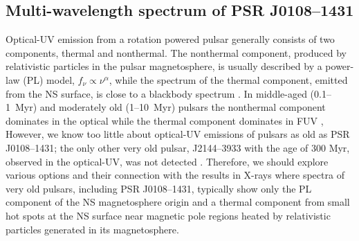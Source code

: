 \documentclass[pdftex,twocolumn]{aastex62}
\newcommand{\gp}[1]{{\color{blue} #1}}
\begin{document}
\subsection{Multi-wavelength  spectrum of PSR J0108--1431}
Optical-UV emission from a rotation powered pulsar generally consists of two components, thermal and nonthermal. The nonthermal component, produced by relativistic particles in the pulsar magnetosphere, is usually described by a power-law (PL) model, $f_\nu \propto \nu^\alpha$, while the spectrum of the thermal component, emitted from the %
NS surface, is close to a blackbody spectrum \citep{2011mignani}. In middle-aged %
(0.1--1~Myr) and moderately 
old (1--10~Myr) pulsars the nonthermal component dominates in the optical 
while the thermal component dominates in FUV 
\citep[e.g.,][]{2001kopts,2004zhar,2006shib,Kargaltsev2007, Pavlov2017},
However, we know too little about optical-UV emissions of pulsars as old as PSR J0108--1431; the only other very old pulsar, J2144--3933 with the age of 300 Myr,
observed in the optical-UV, was not detected \citep{Guillot2019}. Therefore, we should explore various options and their connection with the results 
in X-rays where spectra of very old pulsars, including PSR J0108--1431,  
typically show only the PL component of the NS magnetosphere origin and a thermal component 
from small hot  spots  at the NS surface near magnetic pole regions  heated by relativistic particles generated 
in its magnetosphere. 

\end{document}
